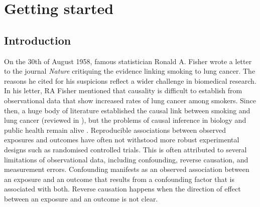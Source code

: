 
\chapter{Getting started}  %

\ifpdf
    \graphicspath{{Chapter1/Figs/Raster/}{Chapter1/Figs/PDF/}{Chapter1/Figs/}}
\else
    \graphicspath{{Chapter1/Figs/Vector/}{Chapter1/Figs/}}
\fi


\section{Introduction} 
On the 30th of August 1958, famous statistician Ronald A. Fisher wrote a letter to the journal \textit{Nature} critiquing the evidence linking smoking to lung cancer. The reasons he cited for his suspicions reflect a wider challenge in biomedical research. In his letter, RA Fisher mentioned that causality is difficult to establish from observational data that show increased rates of lung cancer among smokers. Since then, a huge body of literature established the causal link between smoking and lung cancer (reviewed in \cite{Malone2012-na}), but the problems of causal inference in biology and public health remain alive \cite{Glass2013-up}. Reproducible associations between observed exposures and outcomes have often not withstood more robust experimental designs such as randomised controlled trials. This is often attributed to several limitations of observational data, including confounding, reverse causation, and measurement errors. Confounding manifests as an observed association between an exposure and an outcome that results from a confounding factor that is associated with both. Reverse causation happens when the direction of effect between an exposure and an outcome is not clear.\\

